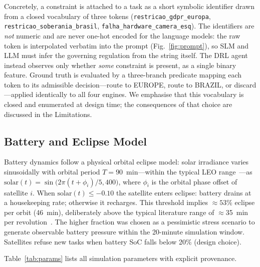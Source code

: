 \documentclass[conference,comsoc,twoside,caption=false]{IEEEtran}
\theoremstyle{definition}
\begin{document}
Concretely, a constraint is attached to a task as a short symbolic identifier
drawn from a closed vocabulary of three tokens
(\texttt{restricao\_gdpr\_europa}, \texttt{restricao\_soberania\_brasil},
\texttt{falha\_hardware\_camera\_esq}). The identifiers are \emph{not} numeric
and are never one-hot encoded for the language models: the raw token is
interpolated verbatim into the prompt (Fig.~\ref{fig:prompt}), so SLM and LLM
must infer the governing regulation from the string itself. The DRL agent
instead observes only whether \emph{some} constraint is present, as a single
binary feature. Ground truth is evaluated by a three-branch predicate mapping
each token to its admissible decision---route to EUROPE, route to BRAZIL, or
discard---applied identically to all four engines. We emphasise that this
vocabulary is closed and enumerated at design time; the consequences of that
choice are discussed in the Limitations.

\subsection{Battery and Eclipse Model}
Battery dynamics follow a physical orbital eclipse model: solar irradiance
varies sinusoidally with orbital period $T = 90$~min---within the typical LEO
range~\cite{guo2024,gpp2022}---as
$\mathrm{solar}(t) = \sin\!\bigl(2\pi(t+\phi_i)/5{,}400\bigr)$,
where $\phi_i$ is the orbital phase offset of satellite $i$. When
$\mathrm{solar}(t) \le -0.10$ the satellite enters eclipse: battery drains at
a housekeeping rate; otherwise it recharges. This threshold implies
$\approx\!53\%$ eclipse per orbit (46~min), deliberately above the typical
literature range of $\approx$35~min per revolution~\cite{sumanth2019}. The
higher fraction was chosen as a pessimistic stress scenario to generate
observable battery pressure within the 20-minute simulation window. Satellites
refuse new tasks when battery \ac{SoC} falls below 20\% (design choice).

Table~\ref{tab:params} lists all simulation parameters with explicit provenance.
\end{document}
